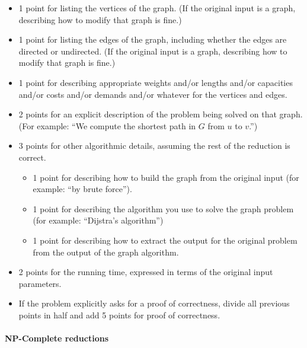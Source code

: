 \documentclass[12pt,answers,addpoints]{exam}
\begin{document}
\begin{itemize}
\item 1 point for listing the vertices of the graph. (If the original
  input is a graph, describing how to modify that graph is
  fine.)

\item 1 point for listing the edges of the graph, including whether
  the edges are directed or undirected. (If the original input is a
  graph, describing how to modify that graph is fine.)

\item 1 point for describing appropriate weights and/or lengths and/or
  capacities and/or costs and/or demands and/or whatever for the
  vertices and edges.

\item 2 points for an explicit description of the problem being solved
  on that graph. (For example: ``We compute the shortest path in $G$
  from $u$ to $v$.'')

\item 3 points for other algorithmic details, assuming the rest of the
  reduction is correct.

  \begin{itemize}[label=+]
    
  \item 1 point for describing how to build the graph from the
    original input (for example: ``by brute force'').

  \item 1 point for describing the algorithm you use to solve the
    graph problem (for example: ``Dijstra's algorithm'')

  \item 1 point for describing how to extract the output for the
    original problem from the output of the graph algorithm.

  \end{itemize}

\item 2 points for the running time, expressed in terms of the
  original input parameters.
  
\item If the problem explicitly asks for a proof of correctness,
  divide all previous points in half and add 5 points for proof of
  correctness.
  
\end{itemize}
\paragraph{NP-Complete reductions}
\end{document}
